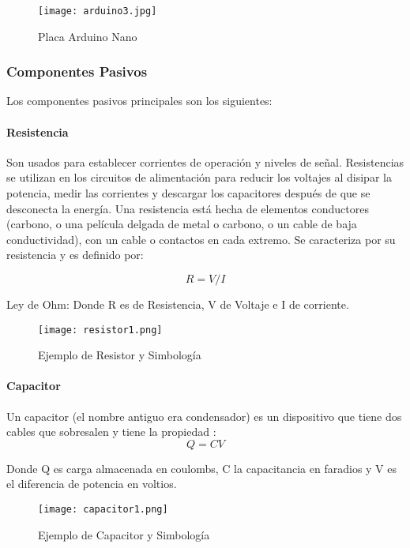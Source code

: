 \begin{figure}[H]
	\centering
	\texttt{[image: arduino3.jpg]}
	\caption{Placa Arduino Nano}
\end{figure}

\subsubsection{Componentes Pasivos}

\par \noindent
Los componentes pasivos principales son los siguientes:

\paragraph{Resistencia}
Son usados para establecer corrientes de operación y niveles de señal. Resistencias se utilizan en los circuitos de alimentación para reducir los voltajes al disipar la potencia, medir las corrientes y descargar los capacitores después de que se desconecta la energía. Una resistencia está hecha de elementos conductores (carbono, o una película delgada de metal o carbono, o un cable de baja conductividad), con un cable o contactos en cada extremo\cite{artofelectronics}. Se caracteriza por su resistencia y es definido por:

$$R = V/I$$

\begin{nscenter}
	Ley de Ohm: Donde R es de Resistencia, V de Voltaje e I de corriente.
\end{nscenter}

\begin{figure}[H]
	\centering
	\texttt{[image: resistor1.png]}
	\caption{Ejemplo de Resistor y Simbología}
\end{figure}

\paragraph{Capacitor }
Un capacitor (el nombre antiguo era
condensador) es un dispositivo que tiene dos cables que sobresalen y tiene la propiedad\cite{artofelectronics} :
$$Q = CV$$ 

\begin{nscenter}
	Donde Q es carga almacenada en coulombs, C la capacitancia en faradios y V es el diferencia de potencia en voltios.
\end{nscenter}

\begin{figure}[H]
	\centering
	\texttt{[image: capacitor1.png]}
	\caption{Ejemplo de Capacitor y Simbología}
\end{figure}

